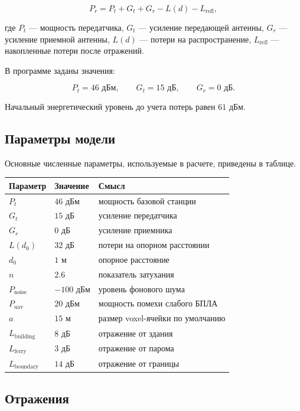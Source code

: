 \documentclass[12pt,a4paper]{article}
\begin{document}
\[
P_r = P_t + G_t + G_r - L(d) - L_{\text{refl}},
\]

где $P_t$ --- мощность передатчика, $G_t$ --- усиление передающей антенны, $G_r$ --- усиление приемной антенны, $L(d)$ --- потери на распространение, $L_{\text{refl}}$ --- накопленные потери после отражений.

В программе заданы значения:

\[
P_t = 46\text{ дБм}, \qquad G_t = 15\text{ дБ}, \qquad G_r = 0\text{ дБ}.
\]

Начальный энергетический уровень до учета потерь равен $61$ дБм.

\subsection{Параметры модели}

Основные численные параметры, используемые в расчете, приведены в таблице.

\begin{center}
\begin{tabular}{lll}
\toprule
Параметр & Значение & Смысл \\
\midrule
$P_t$ & $46$ дБм & мощность базовой станции \\
$G_t$ & $15$ дБ & усиление передатчика \\
$G_r$ & $0$ дБ & усиление приемника \\
$L(d_0)$ & $32$ дБ & потери на опорном расстоянии \\
$d_0$ & $1$ м & опорное расстояние \\
$n$ & $2.6$ & показатель затухания \\
$P_{\text{noise}}$ & $-100$ дБм & уровень фонового шума \\
$P_{\text{uav}}$ & $20$ дБм & мощность помехи слабого БПЛА \\
$a$ & $15$ м & размер voxel-ячейки по умолчанию \\
$L_{\text{building}}$ & $8$ дБ & отражение от здания \\
$L_{\text{ferry}}$ & $3$ дБ & отражение от парома \\
$L_{\text{boundary}}$ & $14$ дБ & отражение от границы \\
\bottomrule
\end{tabular}
\end{center}

\subsection{Отражения}
\end{document}
